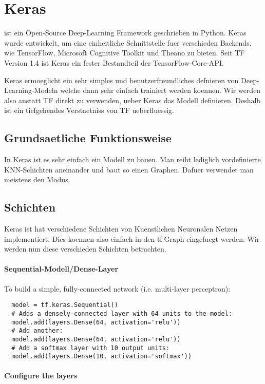 \section{Keras}
 ist ein Open-Source Deep-Learning Framework geschrieben in
Python. Keras wurde entwickelt, um eine einheitliche Schnittstelle fuer
verschieden Backends, wie TensorFlow, Microsoft Cognitive Toolkit und Theano zu
bieten. Seit TF Version 1.4 ist Keras ein fester Bestandteil der TensorFlow-Core-API.

Keras ermoeglicht ein sehr simples und benutzerfreundliches defnieren von
Deep-Learning-Modeln welche dann sehr einfach trainiert werden koennen.
Wir werden also anstatt TF direkt zu verwenden, ueber Keras das Modell definieren.
Deshalb ist ein tiefgehendes Verstaetniss von TF ueberfluessig.

\subsection{Grundsaetliche Funktionsweise}
In Keras ist es sehr einfach ein Modell zu bauen. Man reiht lediglich
vordefinierte KNN-Schichten aneinander und baut so einen Graphen. Dafuer
verwendet man meistens den  Modus.

\subsection{Schichten}
Keras ist hat verschiedene Schichten von Kuenstlichen Neuronalen Netzen
implementiert. Dies koennen also einfach in den tf.Graph eingefuegt werden.
Wir werden nun diese verschieden Schichten betrachten.

\paragraph{Sequential-Modell/Dense-Layer}
To build a simple, fully-connected network (i.e. multi-layer perceptron):
\begin{verbatim}
  model = tf.keras.Sequential()
  # Adds a densely-connected layer with 64 units to the model:
  model.add(layers.Dense(64, activation='relu'))
  # Add another:
  model.add(layers.Dense(64, activation='relu'))
  # Add a softmax layer with 10 output units:
  model.add(layers.Dense(10, activation='softmax'))
\end{verbatim}


\paragraph{Configure the layers}

